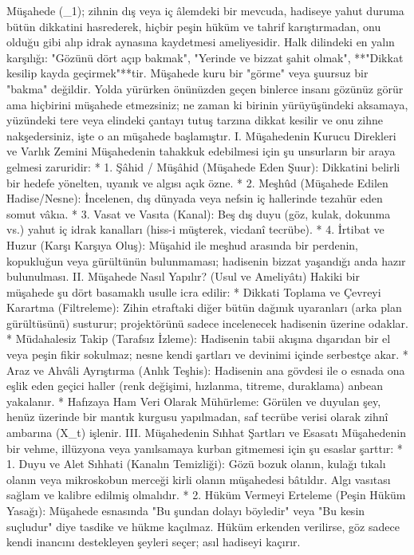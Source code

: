 \documentclass[11pt,a4paper]{article}
\begin{document}
Müşahede (_1); zihnin dış veya iç âlemdeki bir mevcuda, hadiseye yahut duruma bütün dikkatini hasrederek, hiçbir peşin hüküm ve tahrif karıştırmadan, onu olduğu gibi alıp idrak aynasına kaydetmesi ameliyesidir.
Halk dilindeki en yalın karşılığı: "Gözünü dört açıp bakmak", "Yerinde ve bizzat şahit olmak", **"Dikkat kesilip kayda geçirmek"**tir.
Müşahede kuru bir "görme" veya şuursuz bir "bakma" değildir. Yolda yürürken önünüzden geçen binlerce insanı gözünüz görür ama hiçbirini müşahede etmezsiniz; ne zaman ki birinin yürüyüşündeki aksamaya, yüzündeki tere veya elindeki çantayı tutuş tarzına dikkat kesilir ve onu zihne nakşedersiniz, işte o an müşahede başlamıştır.
I. Müşahedenin Kurucu Direkleri ve Varlık Zemini
Müşahedenin tahakkuk edebilmesi için şu unsurların bir araya gelmesi zaruridir:
 * 1. Şâhid / Müşâhid (Müşahede Eden Şuur): Dikkatini belirli bir hedefe yönelten, uyanık ve algısı açık özne.
 * 2. Meşhûd (Müşahede Edilen Hadise/Nesne): İncelenen, dış dünyada veya nefsin iç hallerinde tezahür eden somut vâkıa.
 * 3. Vasat ve Vasıta (Kanal): Beş dış duyu (göz, kulak, dokunma vs.) yahut iç idrak kanalları (hiss-i müşterek, vicdanî tecrübe).
 * 4. İrtibat ve Huzur (Karşı Karşıya Oluş): Müşahid ile meşhud arasında bir perdenin, kopukluğun veya gürültünün bulunmaması; hadisenin bizzat yaşandığı anda hazır bulunulması.
II. Müşahede Nasıl Yapılır? (Usul ve Ameliyâtı)
Hakiki bir müşahede şu dört basamaklı usulle icra edilir:
 * Dikkati Toplama ve Çevreyi Karartma (Filtreleme): Zihin etraftaki diğer bütün dağınık uyaranları (arka plan gürültüsünü) susturur; projektörünü sadece incelenecek hadisenin üzerine odaklar.
 * Müdahalesiz Takip (Tarafsız İzleme): Hadisenin tabii akışına dışarıdan bir el veya peşin fikir sokulmaz; nesne kendi şartları ve devinimi içinde serbestçe akar.
 * Araz ve Ahvâli Ayrıştırma (Anlık Teşhis): Hadisenin ana gövdesi ile o esnada ona eşlik eden geçici haller (renk değişimi, hızlanma, titreme, duraklama) anbean yakalanır.
 * Hafızaya Ham Veri Olarak Mühürleme: Görülen ve duyulan şey, henüz üzerinde bir mantık kurgusu yapılmadan, saf tecrübe verisi olarak zihnî ambarına (X_t) işlenir.
III. Müşahedenin Sıhhat Şartları ve Esasatı
Müşahedenin bir vehme, illüzyona veya yanılsamaya kurban gitmemesi için şu esaslar şarttır:
 * 1. Duyu ve Alet Sıhhati (Kanalın Temizliği):
   Gözü bozuk olanın, kulağı tıkalı olanın veya mikroskobun merceği kirli olanın müşahedesi bâtıldır. Algı vasıtası sağlam ve kalibre edilmiş olmalıdır.
 * 2. Hüküm Vermeyi Erteleme (Peşin Hüküm Yasağı):
   Müşahede esnasında "Bu şundan dolayı böyledir" veya "Bu kesin suçludur" diye tasdike ve hükme kaçılmaz. Hüküm erkenden verilirse, göz sadece kendi inancını destekleyen şeyleri seçer; asıl hadiseyi kaçırır.
\end{document}
